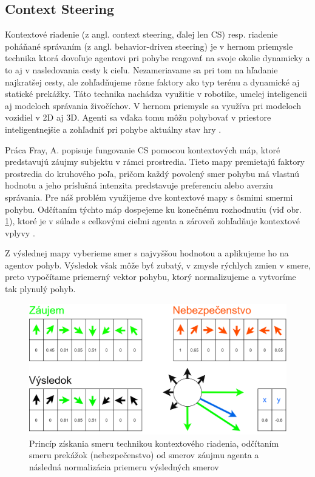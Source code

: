 
\subsection{Context Steering}

Kontextové riadenie (z angl. context steering, ďalej len CS) resp. riadenie poháňané správaním (z angl. behavior-driven steering) je v hernom priemysle technika ktorá dovoľuje agentovi pri pohybe reagovať na svoje okolie dynamicky a to aj v nasledovania cesty k cieľu. Nezameriavame sa pri tom na hľadanie najkratšej cesty, ale zohľadňujeme rôzne faktory ako typ terénu a dynamické aj statické prekážky. Táto technika nachádza využitie v robotike, umelej inteligencii aj modeloch správania živočíchov. V hernom priemysle sa využíva pri modeloch vozidiel v 2D aj 3D. Agenti sa vďaka tomu môžu pohybovať v priestore inteligentnejšie a zohľadniť pri pohybe aktuálny stav hry \cite{reynolds1999steering}.

Práca Fray, A. popisuje fungovanie CS pomocou kontextových máp, ktoré predstavujú záujmy subjektu v rámci prostredia. Tieto mapy premietajú faktory prostredia do kruhového poľa, pričom každý povolený smer pohybu má vlastnú hodnotu a jeho príslušná intenzita predstavuje preferenciu alebo averziu správania. Pre náš problém využijeme dve kontextové mapy s ôsmimi smermi pohybu. Odčítaním týchto máp dospejeme ku konečnému rozhodnutiu (viď obr. \ref{fig:cs}), ktoré je v súlade s celkovými cieľmi agenta a zároveň zohľadňuje kontextové vplyvy \cite{fray2019context}.

Z výslednej mapy vyberieme smer s najvyššou hodnotou a aplikujeme ho na agentov pohyb. Výsledok však môže byť zubatý, v zmysle rýchlych zmien v smere, preto vypočítame priemerný vektor pohybu, ktorý normalizujeme a vytvoríme tak plynulý pohyb.

\begin{figure}[H]
    \centering
    \includegraphics[width=0.9\linewidth]{obrazky-figures/cs.png}
    \caption{Princíp získania smeru technikou kontextového riadenia, odčítaním smeru prekážok (nebezpečenstvo) od smerov záujmu agenta a následná normalizácia priemeru výsledných smerov}
    \label{fig:cs}
\end{figure}

